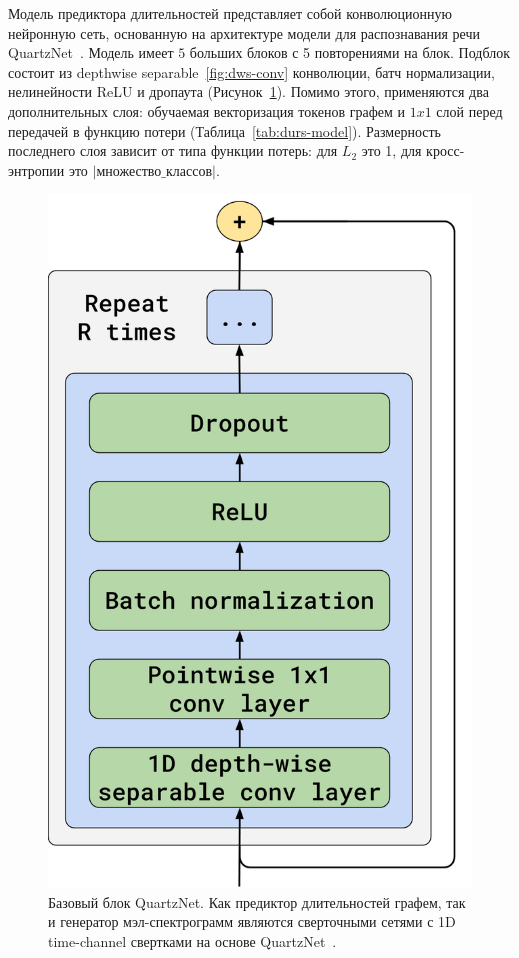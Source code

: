 Модель предиктора длительностей представляет собой конволюционную нейронную сеть, основанную на архитектуре модели для распознавания речи QuartzNet~\cite{quartznet}. Модель имеет $5$ больших блоков с 5 повторениями на блок. Подблок состоит из depthwise separable~\ref{fig:dws-conv} конволюции, батч нормализации, нелинейности ReLU и дропаута (Рисунок~\ref{fig:qn-block}). Помимо этого, применяются два дополнительных слоя: обучаемая векторизация токенов графем и $1x1$ слой перед передачей в функцию потери (Таблица~\ref{tab:durs-model}). Размерность последнего слоя зависит от типа функции потерь: для $L_2$ это 1, для кросс-энтропии это $|\texttt{множество\_классов}|$.

\begin{figure}[!ht]
\centering
\includegraphics[width=0.6\linewidth]{images/qn-block.png}
\caption{Базовый блок QuartzNet. Как предиктор длительностей графем, так и генератор мэл-спектрограмм являются сверточными сетями с 1D time-channel свертками на основе QuartzNet~\cite{quartznet}.}
\label{fig:qn-block}
\end{figure}

